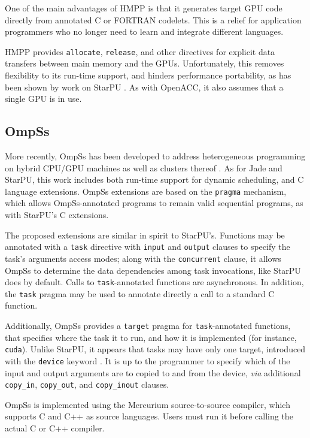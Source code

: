 \documentclass[twoside, a4paper, 10pt]{article}
\begin{document}
One of the main advantages of HMPP is that it generates target GPU code
directly from annotated C or FORTRAN codelets.  This is a relief for
application programmers who no longer need to learn and integrate
different languages.

HMPP provides \texttt{allocate}, \texttt{release}, and other directives for explicit
data transfers between main memory and the GPUs.  Unfortunately, this
removes flexibility to its run-time support, and hinders performance
portability, as has been shown by work on StarPU
\cite{AugThiNamWac09Europar}.  As with OpenACC, it also assumes that a
single GPU is in use.
\subsection{OmpSs}
\label{sec-4-3}


More recently, OmpSs has been developed to address heterogeneous
programming on hybrid CPU/GPU machines as well as clusters thereof
\cite{bueno:2012:ompssgpu}.  As for Jade and StarPU, this work includes
both run-time support for dynamic scheduling, and C language extensions.
OmpSs extensions are based on the \texttt{pragma} mechanism, which allows
OmpSs-annotated programs to remain valid sequential programs, as with
StarPU's C extensions.

The proposed extensions are similar in spirit to StarPU's.  Functions
may be annotated with a \texttt{task} directive with \texttt{input} and \texttt{output}
clauses to specify the task's arguments access modes; along
with the \texttt{concurrent} clause, it allows OmpSs to determine the data
dependencies among task invocations, like StarPU does by default.  Calls
to \texttt{task}-annotated functions are asynchronous.  In addition, the \texttt{task}
pragma may be used to annotate directly a call to a standard C function.

Additionally, OmpSs provides a \texttt{target} pragma for \texttt{task}-annotated
functions, that specifies where the task it to run, and how it is
implemented (for instance, \texttt{cuda}).  Unlike StarPU, it appears that
tasks may have only one target, introduced with the \texttt{device} keyword
\cite{bueno:2012:ompssgpu}.  It is up to the programmer to specify which
of the input and output arguments are to copied to and from the device,
\emph{via} additional \texttt{copy\_in}, \texttt{copy\_out}, and \texttt{copy\_inout} clauses.

OmpSs is implemented using the Mercurium source-to-source compiler,
which supports C and C++ as source languages.  Users must run it before
calling the actual C or C++ compiler.
\end{document}
